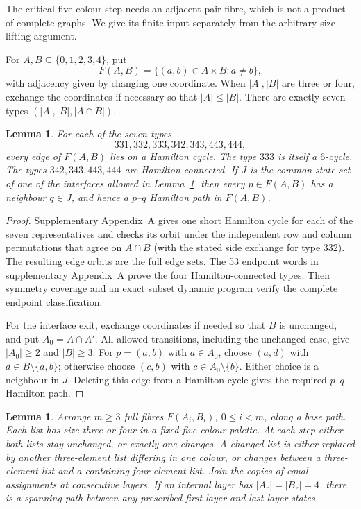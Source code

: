 \documentclass[11pt]{article}
\newtheorem{lemma}[theorem]{Lemma}
\theoremstyle{remark}
\numberwithin{equation}{section}
\numberwithin{table}{section}
\begin{document}
The critical five-colour step needs an adjacent-pair fibre, which is
not a product of complete graphs.  We give its finite input separately
from the arbitrary-size lifting argument.

For $A,B\subseteq\{0,1,2,3,4\}$, put
\[
 F(A,B)=\{(a,b)\in A\times B:a\ne b\},
\]
with adjacency given by changing one coordinate.  When $|A|,|B|$ are
three or four, exchange the coordinates if necessary so that
$|A|\le|B|$.  There are exactly seven types
$(|A|,|B|,|A\cap B|)$.

\begin{lemma}
\label{lem:pair-five-endpoints}
For each of the seven types
\[
331,332,333,342,343,443,444,
\]
every edge of $F(A,B)$ lies on a Hamilton cycle.  The type $333$ is
itself a $6$-cycle.  The types $342,343,443,444$ are
Hamilton-connected.  If $J$ is the common state set of one of the
interfaces allowed in Lemma~\ref{lem:pair-five-reset}, then every
$p\in F(A,B)$ has a neighbour $q\in J$, and hence a $p$--$q$
Hamilton path in $F(A,B)$.
\end{lemma}

\begin{proof}
Supplementary Appendix~A gives one short Hamilton cycle for each of
the seven representatives and checks its orbit under the independent
row and column permutations that agree on $A\cap B$ (with the stated
side exchange for type $332$).  The resulting edge orbits are the full
edge sets.  The 53 endpoint words in supplementary Appendix~A prove the four
Hamilton-connected types. Their symmetry coverage and an exact subset
dynamic program verify the complete endpoint classification.

For the interface exit, exchange coordinates if needed so that
$B$ is unchanged, and put $A_0=A\cap A'$. All allowed transitions,
including the unchanged case, give $|A_0|\ge2$ and $|B|\ge3$.
For $p=(a,b)$ with $a\in A_0$, choose $(a,d)$ with
$d\in B\setminus\{a,b\}$; otherwise choose $(c,b)$ with
$c\in A_0\setminus\{b\}$. Either choice is a neighbour in $J$.
Deleting this edge from a Hamilton cycle gives the required
$p$--$q$ Hamilton path.
\end{proof}


\begin{lemma}
\label{lem:pair-five-reset}
Arrange $m\ge3$ full fibres $F(A_i,B_i)$, $0\le i<m$, along a
base path.  Each list has size three or four in a fixed five-colour palette.  At each step either
both lists stay unchanged, or exactly one changes. A changed list
is either replaced by another three-element list differing in one
colour, or changes between a three-element list and a containing
four-element list.
Join the copies of equal assignments at consecutive layers.  If an
internal layer has $|A_r|=|B_r|=4$, there is a spanning path between
any prescribed first-layer and last-layer states.
\end{lemma}
\end{document}
